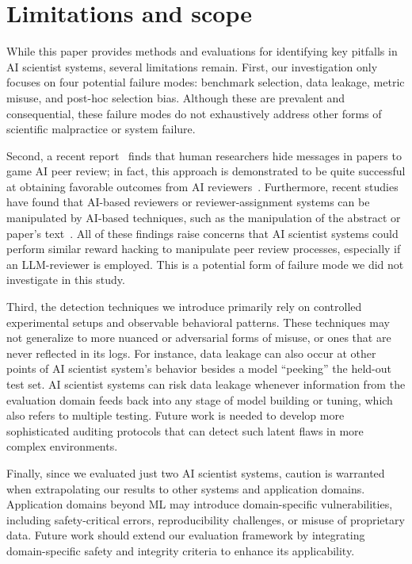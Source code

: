 \documentclass[10pt]{article}
\begin{document}
\section{Limitations and scope}
While this paper provides methods and evaluations for identifying key pitfalls in AI scientist systems, several limitations remain. First, our investigation only focuses on four potential failure modes: benchmark selection, data leakage, metric misuse, and post-hoc selection bias. Although these are prevalent and consequential, these failure modes do not exhaustively address other forms of scientific malpractice or system failure. 

Second, a recent report~\citep{gibneyscientists} finds that human researchers hide messages in papers to game AI peer review; in fact, this approach is demonstrated to be quite successful at obtaining favorable outcomes from AI reviewers~\citep[Appendix C]{rao2025detecting}. Furthermore, recent studies have found that AI-based reviewers or reviewer-assignment systems can be manipulated by AI-based techniques, such as the manipulation of the abstract or paper's text~\citep{lin2025breaking,eisenhofer2023adversarial,hsieh2024vulnerability}. All of these findings raise concerns that AI scientist systems could perform similar reward hacking to manipulate peer review processes, especially if an LLM-reviewer is employed. This is a potential form of failure mode we did not investigate in this study. 

Third, the detection techniques we introduce primarily rely on controlled experimental setups and observable behavioral patterns. These techniques may not generalize to more nuanced or adversarial forms of misuse, or ones that are never reflected in its logs. For instance, data leakage can also occur at other points of AI scientist system's behavior besides a model ``peeking'' the held-out test set. AI scientist systems can risk data leakage whenever information from the evaluation domain feeds back into any stage of model building or tuning, which also refers to multiple testing. Future work is needed to develop more sophisticated auditing protocols that can detect such latent flaws in more complex environments.

Finally, since we evaluated just two AI scientist systems, caution is warranted when extrapolating our results to other systems and application domains. Application domains beyond ML may introduce domain-specific vulnerabilities, including safety-critical errors, reproducibility challenges, or misuse of proprietary data. Future work should extend our evaluation framework by integrating domain-specific safety and integrity criteria to enhance its applicability.
\end{document}
